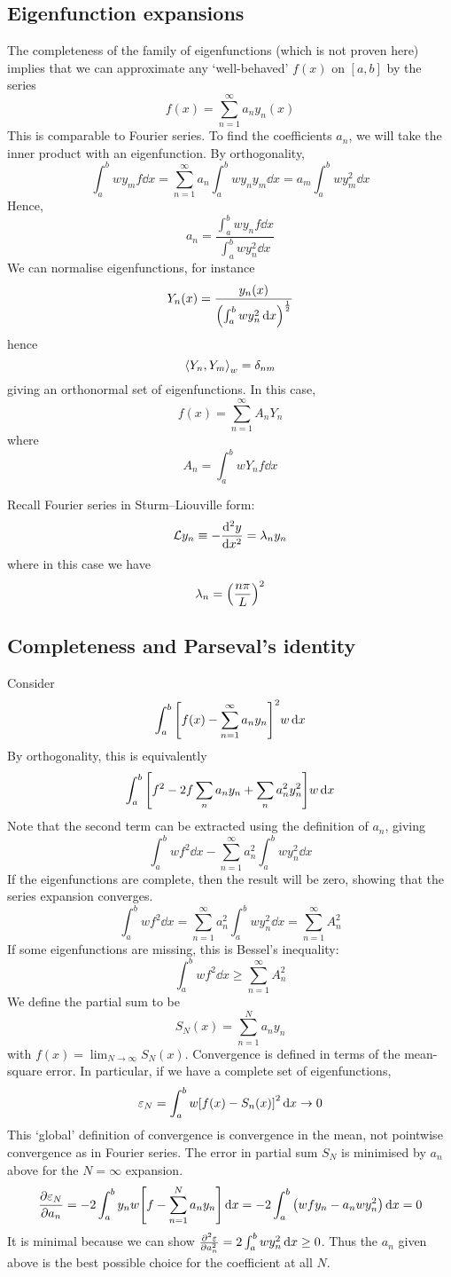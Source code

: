 \subsection{Eigenfunction expansions}
The completeness of the family of eigenfunctions (which is not proven here) implies that we can approximate any `well-behaved' \( f(x) \) on \( [a,b] \) by the series
\[
	f(x) = \sum_{n=1}^\infty a_n y_n(x)
\]
This is comparable to Fourier series.
To find the coefficients \( a_n \), we will take the inner product with an eigenfunction.
By orthogonality,
\[
	\int_a^b w y_m f \dd{x} = \sum_{n=1}^\infty a_n \int_a^b w y_n y_m \dd{x} = a_m \int_a^b w y_m^2 \dd{x}
\]
Hence,
\[
	a_n = \frac{\int_a^b w y_n f \dd{x}}{\int_a^b w y_n^2 \dd{x}}
\]
We can normalise eigenfunctions, for instance
\[
	Y_n(x) = \frac{y_n(x)}{\qty(\int_a^b w y_n^2 \dd{x})^{\frac{1}{2}}}
\]
hence
\[
	\left\langle{Y_n, Y_m}\right\rangle_w = \delta_{nm}
\]
giving an orthonormal set of eigenfunctions.
In this case,
\[
	f(x) = \sum_{n=1}^\infty A_n Y_n
\]
where
\[
	A_n = \int_a^b w Y_n f \dd{x}
\]
\begin{example}
	Recall Fourier series in Sturm--Liouville form:
	\[
		\mathcal L y_n \equiv - \dv[2]{y}{x} = \lambda_n y_n
	\]
	where in this case we have
	\[
		\lambda_n = \qty(\frac{n \pi}{L})^2
	\]
\end{example}

\subsection{Completeness and Parseval's identity}
Consider
\[
	\int_a^b \qty[ f(x) - \sum_{n=1}^\infty a_n y_n ]^2 w \dd{x}
\]
By orthogonality, this is equivalently
\[
	\int_a^b \qty[ f^2 - 2 f \sum_n a_n y_n + \sum_n a_n^2 y_n^2 ] w \dd{x}
\]
Note that the second term can be extracted using the definition of \( a_n \), giving
\[
	\int_a^b wf^2 \dd{x} - \sum_{n=1}^\infty a_n^2 \int_a^b w y_n^2 \dd{x}
\]
If the eigenfunctions are complete, then the result will be zero, showing that the series expansion converges.
\[
	\int_a^b w f^2 \dd{x} = \sum_{n=1}^\infty a_n^2 \int_a^b w y_n^2 \dd{x} = \sum_{n=1}^\infty A_n^2
\]
If some eigenfunctions are missing, this is Bessel's inequality:
\[
	\int_a^b w f^2 \dd{x} \geq \sum_{n=1}^\infty A_n^2
\]
We define the partial sum to be
\[
	S_N(x) = \sum_{n=1}^N a_n y_n
\]
with \( f(x) = \lim_{N \to \infty} S_N(x) \).
Convergence is defined in terms of the mean-square error.
In particular, if we have a complete set of eigenfunctions,
\[
	\varepsilon_N = \int_a^b w \qty[f(x) - S_n(x)]^2 \dd{x} \to 0
\]
This `global' definition of convergence is convergence in the mean, not pointwise convergence as in Fourier series.
The error in partial sum \( S_N \) is minimised by \( a_n \) above for the \( N = \infty \) expansion.
\[
	\pdv{\varepsilon_N}{a_n} = -2 \int_a^b y_n w \qty[ f - \sum_{n=1}^N a_n y_n ] \dd{x} = -2 \int_a^b \qty(wfy_n - a_n w y_n^2) \dd{x} = 0
\]
It is minimal because we can show \( \pdv[2]{\varepsilon}{a_n} = 2 \int_a^b w y_n^2 \dd{x} \geq 0 \).
Thus the \( a_n \) given above is the best possible choice for the coefficient at all \( N \).

